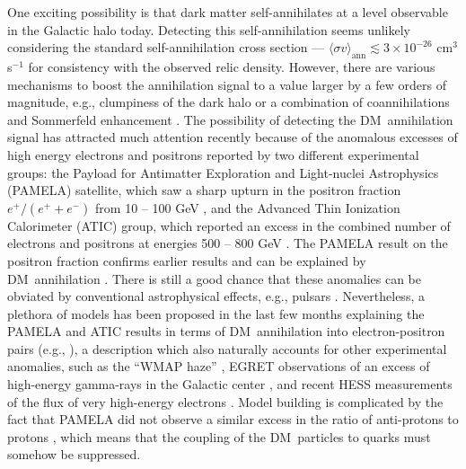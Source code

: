 \documentclass[aps,prd,twocolumn,amsmath,amssymb,floatfix,nofootinbib,10pt]{revtex4}
\newcommand{\DM}{DM}
\newcommand{\sigmaannv}{\ensuremath{\langle\sigma v\rangle}}
\begin{document}
One exciting possibility is that dark matter self-annihilates at a
level observable in the Galactic halo today. Detecting this
self-annihilation seems unlikely considering the standard
self-annihilation cross section --- $\sigmaannv_{\mathrm{ann}}
\lesssim 3 \times 10^{-26} $ cm$^3$ s$^{-1}$ for consistency with the
observed relic density. However, there are various mechanisms to boost
the annihilation signal to a value larger by a few orders of
magnitude, e.g., clumpiness of the dark halo
\cite{1993ApJ...411..439S,1999PhRvD..59d3506B,2008A&A...479..427L,2008ApJ...686..262K}
or a combination of coannihilations and Sommerfeld enhancement
\cite{2005PhRvD..72j3521P,2008arXiv0812.0360L}. The possibility of
detecting the \DM\ annihilation signal has attracted much attention
recently because of the anomalous excesses of high energy electrons
and positrons reported by two different experimental groups: the
Payload for Antimatter Exploration and Light-nuclei Astrophysics
(PAMELA) satellite, which saw a sharp upturn in the positron fraction
$e^+/(e^++e^-)$ from 10 -- 100 GeV \cite{Adriani:2008zr}, and the
Advanced Thin Ionization Calorimeter (ATIC) group, which reported an
excess in the combined number of electrons and positrons at energies
500 -- 800 GeV \cite{2008Natur.456..362C}. The PAMELA result on the
positron fraction confirms earlier results
\cite{1969ApJ...158..771F,1975ApJ...199..669B,1987ApJ...312..183M,1994ApJ...436..769G,Barwick:1997ig,Beatty:2004cy,Aguilar:2007yf}
and can be explained by \DM\ annihilation
\cite{2002PhLB..536..263K,2004PhRvD..69j3509H,2008arXiv0810.5344C}. There
is still a good chance that these anomalies can be obviated by
conventional astrophysical effects, e.g., pulsars
\cite{1995A&A...294L..41A,2008arXiv0810.1527H,2008arXiv0810.2784Y,2008arXiv0812.4457P}. Nevertheless,
a plethora of models has been proposed in the last few months
explaining the PAMELA and ATIC results in terms of \DM\ annihilation
into electron-positron pairs (e.g.,
\cite{2008arXiv0810.5557H,ArkaniHamed:2008qn,2008arXiv0811.0399F,2008arXiv0811.1555I,2008arXiv0811.3357C,2008arXiv0811.3641C,2008arXiv0812.2196A}),
a description which also naturally accounts for other experimental
anomalies, such as the ``WMAP haze''
\cite{Finkbeiner:2003im,Dobler:2007wv,Hooper:2007kb}, EGRET
observations of an excess of high-energy gamma-rays in the Galactic
center \cite{Strong:2005zx}, and recent HESS measurements of the flux
of very high-energy electrons \cite{2008arXiv0811.3894H}. Model
building is complicated by the fact that PAMELA did not observe a
similar excess in the ratio of anti-protons to protons
\cite{2008arXiv0810.4994A}, which means that the coupling of the \DM\
particles to quarks must somehow be suppressed.
\end{document}
